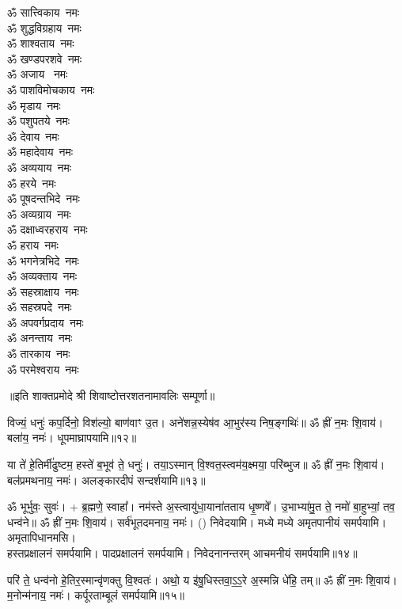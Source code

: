 \begin{multicols}{2}
\begin{flushleft}
ॐ सात्त्विकाय~नमः\\
ॐ शुद्धविग्रहाय~नमः\\
ॐ शाश्वताय~नमः\\
ॐ खण्डपरशवे~नमः\\
ॐ अजाय ~नमः\\
ॐ पाशविमोचकाय~नमः\hfill{}\\
ॐ मृडाय~नमः\\
ॐ पशुपतये~नमः\\
ॐ देवाय~नमः\\
ॐ महादेवाय~नमः\\
ॐ अव्ययाय~नमः\\
ॐ हरये~नमः\\
ॐ पूषदन्तभिदे~नमः\\
ॐ अव्यग्राय~नमः\\
ॐ दक्षाध्वरहराय~नमः\\
ॐ हराय~नमः\hfill{}\\
ॐ भगनेत्रभिदे~नमः\\
ॐ अव्यक्ताय~नमः\\
ॐ सहस्राक्षाय~नमः\\
ॐ सहस्रपदे~नमः\\
ॐ अपवर्गप्रदाय~नमः\\
ॐ अनन्ताय~नमः\\
ॐ तारकाय~नमः\\
ॐ परमेश्वराय~नमः\\
\end{flushleft}
\end{multicols}
॥इति शाक्तप्रमोदे श्री शिवाष्टोत्तरशतनामावलिः सम्पूर्णा॥




विज्यं॒ धनुः॑ कप॒र्दिनो॒ विश॑ल्यो॒ बाण॑वाꣳ उ॒त। अने॑शन्न॒\-स्येष॑व आ॒भुर॑स्य निष॒ङ्गथिः॑॥ ॐ ह्रीं न॒मः शि॒वाय॑। बला॑य॒ नमः॑। धूपमाघ्रापयामि॥१२॥

या ते॑ हे॒तिर्मी॑ढुष्टम॒ हस्ते॑ ब॒भूव॑ ते॒ धनुः॑। तया॒ऽस्मान् वि॒श्वत॒स्त्वम॑य॒क्ष्मया॒ परि॑ब्भुज॥ ॐ ह्रीं न॒मः शि॒वाय॑। बल॑प्रमथनाय॒ नमः॑। अलङ्कारदीपं सन्दर्शयामि॥१३॥

ॐ भूर्भुवः॒ सुवः॑। + ब्र॒ह्मणे॒ स्वाहा᳚। नम॑स्ते अ॒स्त्वायु॑धा॒याना॑तताय धृ॒ष्णवे᳚। उ॒भाभ्या॑मु॒त ते॒ नमो॑ बा॒हुभ्यां॒ तव॒ धन्व॑ने॥ ॐ ह्रीं न॒मः शि॒वाय॑। सर्व॑भूतदमनाय॒ नमः॑। () निवेदयामि। मध्ये मध्ये अमृतपानीयं समर्पयामि। अमृतापिधानमसि।\\
हस्तप्रक्षालनं समर्पयामि। पादप्रक्षालनं समर्पयामि। निवेदनानन्तरम् आचमनीयं समर्पयामि॥१४॥

परि॑ ते॒ धन्व॑नो हे॒तिर॒स्मान्वृ॑णक्तु वि॒श्वतः॑। अथो॒ य इ॑षु॒धिस्तवा॒ऽ॒ऽ॒रे अ॒स्मन्नि धे॑हि॒ तम्॥ ॐ ह्रीं न॒मः शि॒वाय॑। म॒नोन्म॑नाय॒ नमः॑। कर्पूरताम्बूलं समर्पयामि॥१५॥

